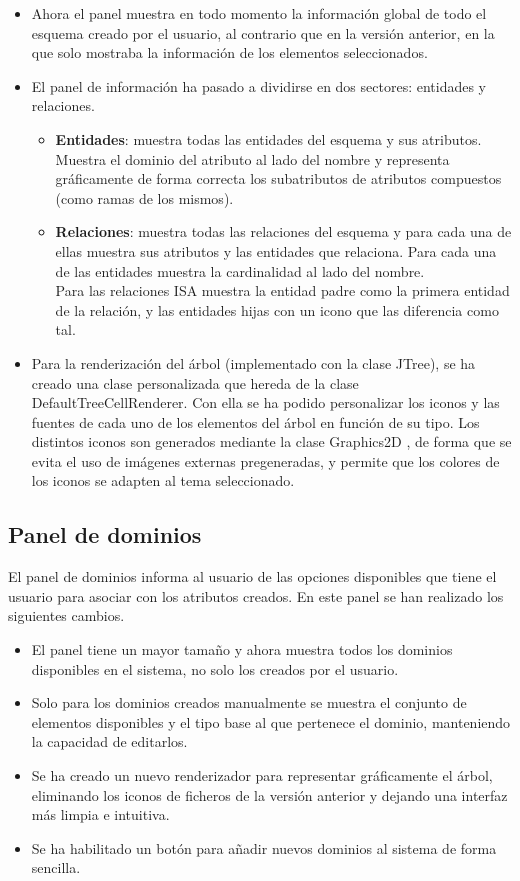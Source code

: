 \begin{itemize}
    \item Ahora el panel muestra en todo momento la información global de todo el esquema creado por el usuario, al contrario que en la versión anterior, en la que solo mostraba la información de los elementos seleccionados.
    \item El panel de información ha pasado a dividirse en dos sectores: entidades y relaciones.
    \begin{itemize}
        \item \textbf{Entidades}: muestra todas las entidades del esquema y sus atributos. Muestra el dominio del atributo al lado del nombre y representa gráficamente de forma correcta los subatributos de atributos compuestos (como ramas de los mismos).
        \item \textbf{Relaciones}: muestra todas las relaciones del esquema y para cada una de ellas muestra sus atributos y las entidades que relaciona. Para cada una de las entidades muestra la cardinalidad al lado del nombre.\\
        
        Para las relaciones ISA muestra la entidad padre como la primera entidad de la relación, y las entidades hijas con un icono que las diferencia como tal.
    \end{itemize}
    \item Para la renderización del árbol (implementado con la clase JTree), se ha creado una clase personalizada que hereda de la clase DefaultTreeCellRenderer. Con ella se ha podido personalizar los iconos y las fuentes de cada uno de los elementos del árbol en función de su tipo. Los distintos iconos son generados mediante la clase Graphics2D \cite{g2d}, de forma que se evita el uso de imágenes externas pregeneradas, y permite que los colores de los iconos se adapten al tema seleccionado.
\end{itemize}

\subsection{Panel de dominios}
El panel de dominios informa al usuario de las opciones disponibles que tiene el usuario para asociar con los atributos creados. En este panel se han realizado los siguientes cambios.
\begin{itemize}
    \item El panel tiene un mayor tamaño y ahora muestra todos los dominios disponibles en el sistema, no solo los creados por el usuario.
    \item Solo para los dominios creados manualmente se muestra el conjunto de elementos disponibles y el tipo base al que pertenece el dominio, manteniendo la capacidad de editarlos.
    \item Se ha creado un nuevo renderizador para representar gráficamente el árbol, eliminando los iconos de ficheros de la versión anterior y dejando una interfaz más limpia e intuitiva.
    \item Se ha habilitado un botón para añadir nuevos dominios al sistema de forma sencilla.
\end{itemize}

